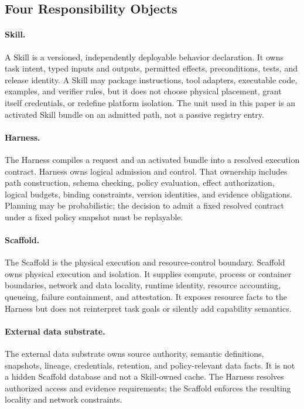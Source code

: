 \subsection{Four Responsibility Objects}

\paragraph{Skill.}
A Skill is a versioned, independently deployable behavior declaration. It owns task intent, typed inputs and outputs, permitted effects, preconditions, tests, and release identity. A Skill may package instructions, tool adapters, executable code, examples, and verifier rules, but it does not choose physical placement, grant itself credentials, or redefine platform isolation. The unit used in this paper is an activated Skill bundle on an admitted path, not a passive registry entry.

\paragraph{Harness.}
The Harness compiles a request and an activated bundle into a resolved execution contract. Harness owns logical admission and control. That ownership includes path construction, schema checking, policy evaluation, effect authorization, logical budgets, binding constraints, version identities, and evidence obligations. Planning may be probabilistic; the decision to admit a fixed resolved contract under a fixed policy snapshot must be replayable.

\paragraph{Scaffold.}
The Scaffold is the physical execution and resource-control boundary. Scaffold owns physical execution and isolation. It supplies compute, process or container boundaries, network and data locality, runtime identity, resource accounting, queueing, failure containment, and attestation. It exposes resource facts to the Harness but does not reinterpret task goals or silently add capability semantics.

\paragraph{External data substrate.}
The external data substrate owns source authority, semantic definitions, snapshots, lineage, credentials, retention, and policy-relevant data facts. It is not a hidden Scaffold database and not a Skill-owned cache. The Harness resolves authorized access and evidence requirements; the Scaffold enforces the resulting locality and network constraints.

